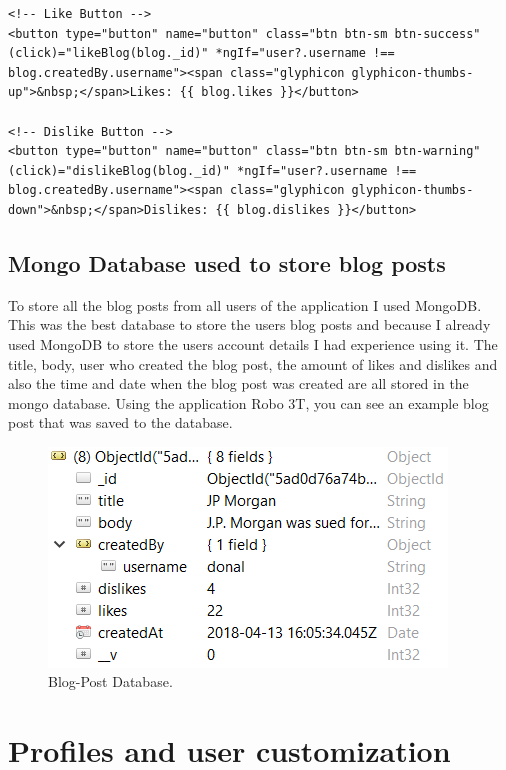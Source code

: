 \begin{lstlisting}
<!-- Like Button -->
<button type="button" name="button" class="btn btn-sm btn-success" (click)="likeBlog(blog._id)" *ngIf="user?.username !== blog.createdBy.username"><span class="glyphicon glyphicon-thumbs-up">&nbsp;</span>Likes: {{ blog.likes }}</button>

<!-- Dislike Button -->
<button type="button" name="button" class="btn btn-sm btn-warning" (click)="dislikeBlog(blog._id)" *ngIf="user?.username !== blog.createdBy.username"><span class="glyphicon glyphicon-thumbs-down">&nbsp;</span>Dislikes: {{ blog.dislikes }}</button>
\end{lstlisting}

\subsection{Mongo Database used to store blog posts}
To store all the blog posts from all users of the application I used MongoDB. This was the best database to store the users blog posts and because I already used MongoDB to store the users account details I had experience using it. The title, body, user who created the blog post, the amount of likes and dislikes and also the time and date when the blog post was created are all stored in the mongo database. Using the application Robo 3T, you can see an example blog post that was saved to the database.

\begin{figure}[H]
\centering
\includegraphics{img/blogpost-database.png}
\caption{Blog-Post Database.}
\end{figure}



\section{Profiles and user customization}

